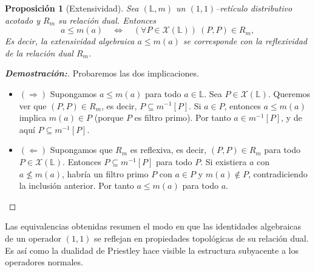 \documentclass[12pt]{book}
\newtheorem{proposition}[theorem]{Proposición}
\begin{document}
\begin{proposition}[Extensividad]
Sea $(\mathbb{L},m)$ un $(1,1)$–retículo distributivo acotado y $R_m$ su relación dual. Entonces
\[
a\leq m(a)
\quad\Longleftrightarrow\quad
(\forall P\in\mathcal{X}(\mathbb{L}))\ (P,P)\in R_m,
\]
Es decir, la extensividad algebraica $a\le m(a)$ se corresponde con la \emph{reflexividad} de la relación dual $R_m$.
\end{proposition}

\begin{proof}[{\textbf{Demostración:}}]Probaremos las dos implicaciones.
\begin{itemize}
    \item $(\Rightarrow)$
Supongamos $a\leq m(a)$ para todo $a\in\mathbb{L}$.
Sea $P\in\mathcal{X}(\mathbb{L})$. Queremos ver que $(P,P)\in R_m$,
es decir, $P\subseteq m^{-1}[P]$.  
Si $a\in P$, entonces $a\le m(a)$ implica $m(a)\in P$
(porque $P$ es filtro primo). Por tanto $a\in m^{-1}[P]$, y de aquí
$P\subseteq m^{-1}[P]$.

\item $(\Leftarrow)$
Supongamos que $R_m$ es reflexiva, es decir,
$(P,P)\in R_m$ para todo $P\in\mathcal{X}(\mathbb{L})$.
Entonces $P\subseteq m^{-1}[P]$ para todo $P$.  
Si existiera $a$ con $a\not\le m(a)$, habría un filtro primo $P$
con $a\in P$ y $m(a)\notin P$, contradiciendo la inclusión anterior.
Por tanto $a\le m(a)$ para todo $a$.
\end{itemize}
\end{proof}
Las equivalencias obtenidas resumen el modo en que las identidades
algebraicas de un operador $(1,1)$ se reflejan en propiedades topológicas
de su relación dual. Es así como la dualidad de Priestley hace visible la
estructura subyacente a los operadores normales.






\end{document}

